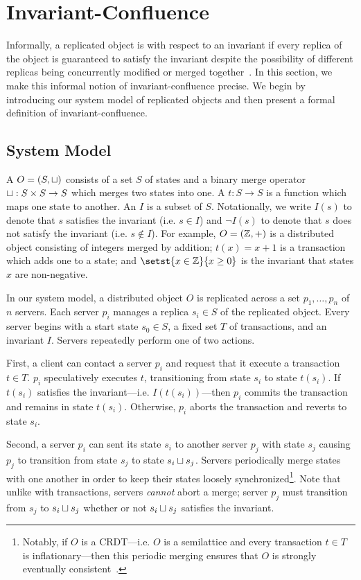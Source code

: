 \section{Invariant-Confluence}
Informally, a replicated object is  with respect
to an invariant if every replica of the object is guaranteed to satisfy the
invariant despite the possibility of different replicas being concurrently
modified or merged together~\cite{bailis2014coordination}. In this section, we
make this informal notion of invariant-confluence precise. We begin by
introducing our system model of replicated objects and then present a formal
definition of invariant-confluence.

\subsection{System Model}
A  $O = (S, \sqcup)$ consists of a set $S$ of
states and a binary merge operator $\sqcup: S \times S \to S$ which merges two
states into one. A  $t: S \to S$ is a function which maps
one state to another. An  $I$ is a subset of $S$.
Notationally, we write $I(s)$ to denote that $s$ satisfies the invariant (i.e.
$s \in I$) and $\lnot I(s)$ to denote that $s$ does not satisfy the invariant
(i.e. $s \notin I$).
%
For example, $O = (\mathbb{Z}, +)$ is a distributed object consisting of integers
merged by addition; $t(x) = x + 1$ is a transaction which adds one to a state;
and $\setst{x \in \ints}{x \geq 0}$ is the invariant that states $x$ are
non-negative.

In our system model, a distributed object $O$ is replicated across a set $p_1,
\ldots, p_n$ of $n$ servers. Each server $p_i$ manages a replica $s_i \in S$ of
the replicated object. Every server begins with a start state $s_0 \in S$, a
fixed set $T$ of transactions, and an invariant $I$. Servers repeatedly perform
one of two actions.

First, a client can contact a server $p_i$ and request that it execute a
transaction $t \in T$. $p_i$ speculatively executes $t$, transitioning from
state $s_i$ to state $t(s_i)$. If $t(s_i)$ satisfies the invariant---i.e.
$I(t(s_i))$---then $p_i$ commits the transaction and remains in state $t(s_i)$.
Otherwise, $p_i$ aborts the transaction and reverts to state $s_i$.

Second, a server $p_i$ can sent its state $s_i$ to another server $p_j$ with
state $s_j$ causing $p_j$ to transition from state $s_j$  to state $s_i \sqcup
s_j$. Servers periodically merge states with one another in order to keep their
states loosely synchronized\footnote{%
  Notably, if $O$ is a CRDT---i.e. $O$ is a semilattice and every transaction
  $t \in T$ is inflationary---then this periodic merging ensures that $O$ is
  strongly eventually consistent~\cite{shapiro2011conflict}.
}.
Note that unlike with transactions, servers \emph{cannot} abort a merge; server
$p_j$ must transition from $s_j$ to $s_i \sqcup s_j$ whether or not $s_i \sqcup
s_j$ satisfies the invariant.

